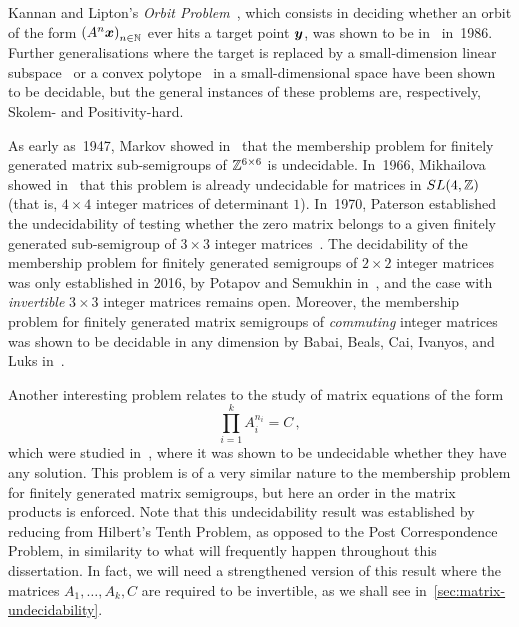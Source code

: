 Kannan and Lipton's \emph{Orbit Problem}~\cite{KL86}, which consists in deciding whether an orbit of the form ${(A^{n} \boldsymbol{x})}_{n \in \mathbb{N}}$ ever hits a target point $\boldsymbol{y}$, was shown to be in~\PTIME{} in~1986. Further generalisations where the target is replaced by a small-dimension linear subspace~\cite{COW13} or a convex polytope~\cite{COW15:SODA} in a small-dimensional space have been shown to be decidable, but the general instances of these problems are, respectively, Skolem- and Positivity-hard.

As early as~1947, Markov showed in~\cite[in Russian]{Markov1947} that the membership problem for finitely generated matrix sub-semigroups of $\mathbb{Z}^{6 \times 6}$ is undecidable.
In~1966, Mikhailova showed in~\cite[in Russian]{Mik66} that this problem is already undecidable for matrices in $SL(4,\mathbb{Z})$ (that is, $4\times 4$ integer matrices of determinant $1$).
In~1970, Paterson established the undecidability of testing whether the zero matrix belongs to a given finitely generated sub-semigroup of $3 \times 3$ integer matrices~\cite{Paterson}.
The decidability of the membership problem for finitely generated semigroups of $2 \times 2$ integer matrices was only established in 2016, by Potapov and Semukhin in~\cite{PS2Z}, and the case with \emph{invertible} $3\times 3$ integer matrices remains open.
Moreover, the membership problem for finitely generated matrix semigroups of \emph{commuting} integer matrices was shown to be decidable in any dimension by Babai, Beals, Cai, Ivanyos, and Luks in~\cite{MultiplicativeMatrixEquations}.

Another interesting problem relates to the study of matrix equations of the form
\begin{equation*}
  \prod\limits_{i=1}^{k} A_{i}^{n_{i}} = C \, ,
\end{equation*}
which were studied in~\cite{MEHTP}, where it was shown to be undecidable whether they have any solution. This problem is of a very similar nature to the membership problem for finitely generated matrix semigroups, but here an order in the matrix products is enforced. Note that this undecidability result was established by reducing from Hilbert's Tenth Problem, as opposed to the Post Correspondence Problem, in similarity to what will frequently happen throughout this dissertation. In fact, we will need a strengthened version of this result where the matrices $A_{1}, \ldots, A_{k}, C$ are required to be invertible, as we shall see in~\cref{sec:matrix-undecidability}.

